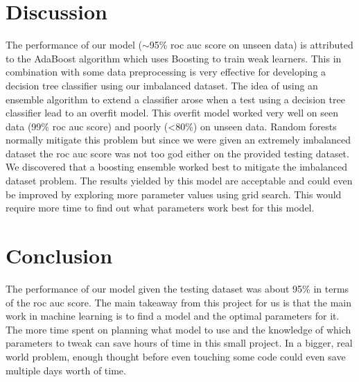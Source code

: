 \documentclass[a4, 10 pt, conference]{ieeeconf}  %
\begin{document}
\section{Discussion}
\label{sec:discuss}
{\color{black}
\begin{itemize}
	\textbfn 
	The performance of our model (\(\sim\)\num{95}\% roc auc score on unseen data) is attributed to the AdaBoost algorithm which uses Boosting to train 	weak learners. This in combination with some data preprocessing is very effective for developing a decision tree classifier using our 			imbalanced dataset. 
	The idea of using an ensemble algorithm to extend a classifier arose when a test using a decision tree classifier lead to an overfit model. 		This overfit model worked very well on seen data (99\% roc auc score) and poorly (\textless 80\%) on unseen data. Random forests normally 		mitigate this problem but since we were given an extremely imbalanced dataset the roc auc score was not too god either on the provided 		testing dataset. We discovered that a boosting ensemble worked best to mitigate the imbalanced dataset problem.			The results 	yielded by this model are acceptable and could even be improved by exploring more parameter values using grid search. This would require 	more time to find out what parameters work best for this model.


\end{itemize}
}

\section{Conclusion}
\label{sec:con}

{\color{black}

  \begin{itemize}
  The performance of our model given the testing dataset was about 95\% in terms of the roc auc score.\newline
\textbfn The main takeaway from this project for us is that the main work in machine learning is to find a model and the optimal parameters for it. The more time spent on planning what model to use and the knowledge of which parameters to tweak can save hours of time in this small project. In a bigger, real world problem, enough thought before even touching some code could even save multiple days worth of time.
  \end{itemize}

}

\end{document}
